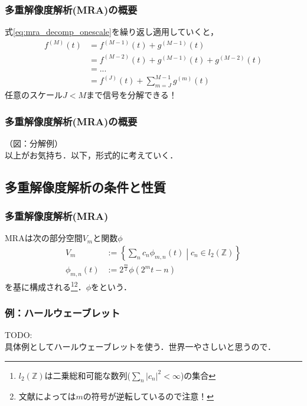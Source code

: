 \documentclass[dvipdfmx,graphicx,14pt]{beamer}
\begin{document}
\begin{frame}[c]
    \frametitle{多重解像度解析(MRA)の概要}
    式\eqref{eq:mra_decomp_onescale}を繰り返し適用していくと，
    \begin{align}
        f^{(M)}(t) &= f^{(M-1)}(t) + g^{(M-1)}(t) \nonumber \\
        &= f^{(M-2)}(t) + g^{(M-1)}(t) + g^{(M-2)}(t) \nonumber \\
        &= ... \nonumber \\
        &= f^{(J)}(t) + \sum_{m=J}^{M-1} g^{(m)}(t) \label{eq:mra_decomp_multiscale}
    \end{align}
    任意のスケール$J < M$まで信号を分解できる！
\end{frame}

\begin{frame}[c]
    \frametitle{多重解像度解析(MRA)の概要}
    （図：分解例）
    \\
    以上がお気持ち．以下，形式的に考えていく．
\end{frame}

\subsection{多重解像度解析の条件と性質}

\begin{frame}[c]
    \frametitle{多重解像度解析(MRA)}
    MRAは次の部分空間$V_{m}$と関数$\phi$
    \begin{align}
        V_{m} &:= \left\{ \sum_{n} c_{n} \phi_{m,n}(t) \middle| c_{n} \in l_{2}(\mathbb{Z}) \right\} \\
        \phi_{m,n}(t) &:= 2^{\frac{m}{2}}\phi(2^{m}t - n)
    \end{align}
    を基に構成される\footnote{$l_{2}(\mathbb{Z})$は二乗総和可能な数列($\sum_{n} |c_{n}|^{2} < \infty$)の集合}\footnote{文献によっては$m$の符号が逆転しているので注意！}．$\phi$をという．
\end{frame}

\begin{frame}[c]
    \frametitle{例：ハールウェーブレット}
    TODO:\\
    具体例としてハールウェーブレットを使う．世界一やさしいと思うので．
\end{frame}
\end{document}
